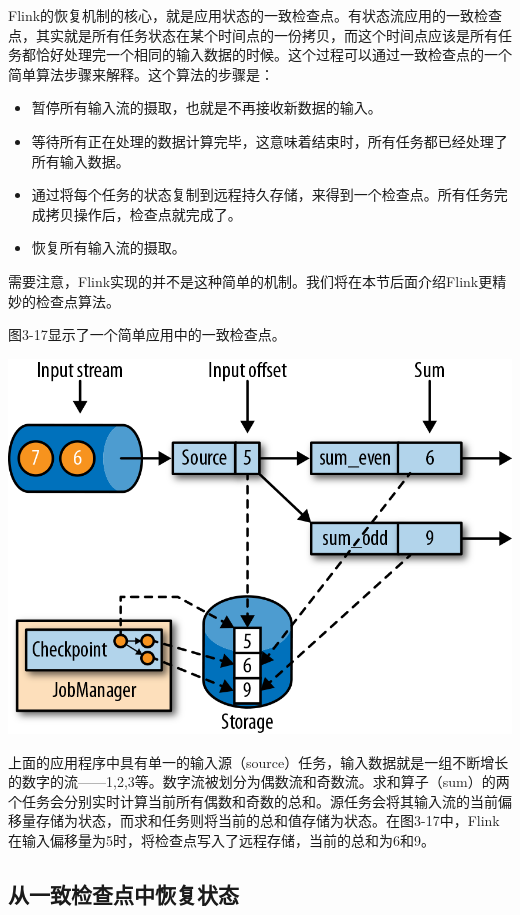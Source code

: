 \documentclass[cn,11pt,chinese]{elegantbook}
\providecommand{\tightlist}{%
  \setlength{\itemsep}{0pt}\setlength{\parskip}{0pt}}
\begin{document}
Flink的恢复机制的核心，就是应用状态的一致检查点。有状态流应用的一致检查点，其实就是所有任务状态在某个时间点的一份拷贝，而这个时间点应该是所有任务都恰好处理完一个相同的输入数据的时候。这个过程可以通过一致检查点的一个简单算法步骤来解释。这个算法的步骤是：

\begin{itemize}
\tightlist
\item
  暂停所有输入流的摄取，也就是不再接收新数据的输入。
\item
  等待所有正在处理的数据计算完毕，这意味着结束时，所有任务都已经处理了所有输入数据。
\item
  通过将每个任务的状态复制到远程持久存储，来得到一个检查点。所有任务完成拷贝操作后，检查点就完成了。
\item
  恢复所有输入流的摄取。
\end{itemize}

需要注意，Flink实现的并不是这种简单的机制。我们将在本节后面介绍Flink更精妙的检查点算法。

图3-17显示了一个简单应用中的一致检查点。

\includegraphics{images/spaf_0317.png}

上面的应用程序中具有单一的输入源（source）任务，输入数据就是一组不断增长的数字的流------1,2,3等。数字流被划分为偶数流和奇数流。求和算子（sum）的两个任务会分别实时计算当前所有偶数和奇数的总和。源任务会将其输入流的当前偏移量存储为状态，而求和任务则将当前的总和值存储为状态。在图3-17中，Flink在输入偏移量为5时，将检查点写入了远程存储，当前的总和为6和9。

\hypertarget{ux4eceux4e00ux81f4ux68c0ux67e5ux70b9ux4e2dux6062ux590dux72b6ux6001}{%
\subsection{从一致检查点中恢复状态}\label{ux4eceux4e00ux81f4ux68c0ux67e5ux70b9ux4e2dux6062ux590dux72b6ux6001}}
\end{document}
